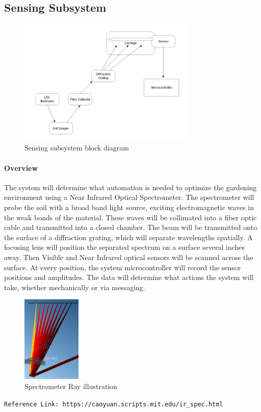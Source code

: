 \subsection{Sensing Subsystem}
\label{sec:sensing_subsystem}
\begin{figure}[H]
    \caption{Sensing subsystem block diagram}
    \centering
    \includegraphics[width=0.75\textwidth]{images/OpticsBlockDiagram.png}
\end{figure}


\paragraph{Overview} The system will determine what automation is needed to optimize the gardening environment using a Near Infrared Optical Spectrometer. The spectrometer will probe the soil with a broad band light source, exciting electromagnetic waves in the weak bonds of the material. These waves will be collimated into a fiber optic cable and transmitted into a closed chamber. The beam will be transmitted onto the surface of a diffraction grating, which will separate wavelengths spatially. A focusing lens will position the separated spectrum on a surface several inches away. Then Visible and Near Infrared optical sensors will be scanned across the surface. At every position, the system microcontroller will record the sensor positions and amplitudes. The data will determine what actions the system will take, whether mechanically or via messaging.

\begin{figure}[H]
    \caption{Spectrometer Ray illustration}
    \centering
    \includegraphics[width=0.25\textwidth]{images/YuanCaoSpectrometer.png}
\end{figure}
\verb"Reference Link: https://caoyuan.scripts.mit.edu/ir_spec.html"

